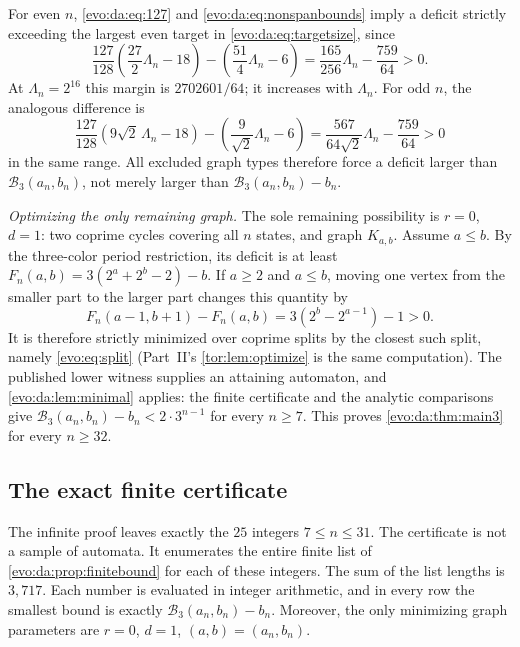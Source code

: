 \documentclass[11pt,a4paper]{article}
\numberwithin{equation}{section}
\theoremstyle{definition}
\theoremstyle{remark}
\newcommand{\Bip}{\mathcal B}
\begin{document}
For even $n$, \eqref{evo:da:eq:127} and \eqref{evo:da:eq:nonspanbounds} imply
a deficit strictly exceeding the largest even target in
\eqref{evo:da:eq:targetsize}, since
\begin{equation}\label{evo:da:eq:evenmargin}
\frac{127}{128}\left(\frac{27}{2}\Lambda_n-18\right)
-\left(\frac{51}{4}\Lambda_n-6\right)
=\frac{165}{256}\Lambda_n-\frac{759}{64}>0.
\end{equation}
At $\Lambda_n=2^{16}$ this margin is $2702601/64$; it increases with
$\Lambda_n$. For odd $n$, the analogous difference is
\[
 \frac{127}{128}(9\sqrt2\,\Lambda_n-18)
 -\left(\frac9{\sqrt2}\Lambda_n-6\right)
 =\frac{567}{64\sqrt2}\Lambda_n-\frac{759}{64}>0
\]
in the same range. All excluded graph types therefore force a deficit larger
than $\Bip_3(a_n,b_n)$, not merely larger than $\Bip_3(a_n,b_n)-b_n$.

\emph{Optimizing the only remaining graph.} The sole remaining possibility is
$r=0$, $d=1$: two coprime cycles covering all $n$ states, and graph $K_{a,b}$.
Assume $a\le b$. By the three-color period restriction, its deficit is at
least $F_n(a,b)=3(2^a+2^b-2)-b$. If $a\ge2$ and $a\le b$, moving one vertex
from the smaller part to the larger part changes this quantity by
\begin{equation}\label{evo:da:eq:monotone3}
 F_n(a-1,b+1)-F_n(a,b)=3(2^b-2^{a-1})-1>0.
\end{equation}
It is therefore strictly minimized over coprime splits by the closest such
split, namely \eqref{evo:eq:split} (Part~II's \cref{tor:lem:optimize} is the
same computation). The published lower witness supplies an attaining
automaton, and \cref{evo:da:lem:minimal} applies: the finite certificate and
the analytic comparisons give $\Bip_3(a_n,b_n)-b_n<2\cdot3^{n-1}$ for every
$n\ge7$. This proves \cref{evo:da:thm:main3} for every $n\ge32$.

\subsection{The exact finite certificate}\label{evo:da:sec:finite}

The infinite proof leaves exactly the $25$ integers $7\le n\le31$. The
certificate is not a sample of automata. It enumerates the entire finite list
of \cref{evo:da:prop:finitebound} for each of these integers. The sum of the
list lengths is $3{,}717$. Each number is evaluated in integer arithmetic, and
in every row the smallest bound is exactly $\Bip_3(a_n,b_n)-b_n$. Moreover,
the only minimizing graph parameters are $r=0$, $d=1$, $(a,b)=(a_n,b_n)$.
\end{document}
